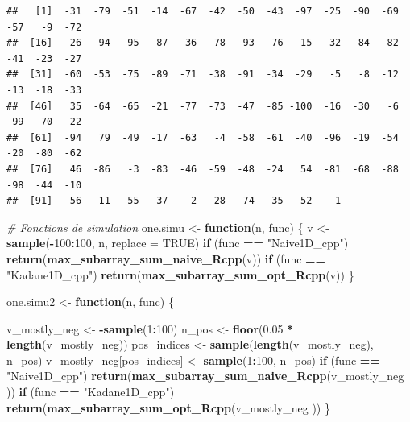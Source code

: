 \documentclass[
]{article}
\newenvironment{Shaded}{\begin{snugshade}}{\end{snugshade}}
\newcommand{\AttributeTok}[1]{\textcolor[rgb]{0.13,0.29,0.53}{#1}}
\newcommand{\CommentTok}[1]{\textcolor[rgb]{0.56,0.35,0.01}{\textit{#1}}}
\newcommand{\ConstantTok}[1]{\textcolor[rgb]{0.56,0.35,0.01}{#1}}
\newcommand{\ControlFlowTok}[1]{\textcolor[rgb]{0.13,0.29,0.53}{\textbf{#1}}}
\newcommand{\DecValTok}[1]{\textcolor[rgb]{0.00,0.00,0.81}{#1}}
\newcommand{\FloatTok}[1]{\textcolor[rgb]{0.00,0.00,0.81}{#1}}
\newcommand{\FunctionTok}[1]{\textcolor[rgb]{0.13,0.29,0.53}{\textbf{#1}}}
\newcommand{\NormalTok}[1]{#1}
\newcommand{\OtherTok}[1]{\textcolor[rgb]{0.56,0.35,0.01}{#1}}
\newcommand{\SpecialCharTok}[1]{\textcolor[rgb]{0.81,0.36,0.00}{\textbf{#1}}}
\newcommand{\StringTok}[1]{\textcolor[rgb]{0.31,0.60,0.02}{#1}}
\begin{document}
\begin{verbatim}
##   [1]  -31  -79  -51  -14  -67  -42  -50  -43  -97  -25  -90  -69  -57   -9  -72
##  [16]  -26   94  -95  -87  -36  -78  -93  -76  -15  -32  -84  -82  -41  -23  -27
##  [31]  -60  -53  -75  -89  -71  -38  -91  -34  -29   -5   -8  -12  -13  -18  -33
##  [46]   35  -64  -65  -21  -77  -73  -47  -85 -100  -16  -30   -6  -99  -70  -22
##  [61]  -94   79  -49  -17  -63   -4  -58  -61  -40  -96  -19  -54  -20  -80  -62
##  [76]   46  -86   -3  -83  -46  -59  -48  -24   54  -81  -68  -88  -98  -44  -10
##  [91]  -56  -11  -55  -37   -2  -28  -74  -35  -52   -1
\end{verbatim}

\begin{Shaded}
\begin{Highlighting}[]
\CommentTok{\# Fonctions de simulation}
\NormalTok{one.simu }\OtherTok{\textless{}{-}} \ControlFlowTok{function}\NormalTok{(n, func) \{}
\NormalTok{  v }\OtherTok{\textless{}{-}} \FunctionTok{sample}\NormalTok{(}\SpecialCharTok{{-}}\DecValTok{100}\SpecialCharTok{:}\DecValTok{100}\NormalTok{, n, }\AttributeTok{replace =} \ConstantTok{TRUE}\NormalTok{)}
  \ControlFlowTok{if}\NormalTok{ (func }\SpecialCharTok{==} \StringTok{"Naive1D\_cpp"}\NormalTok{) }\FunctionTok{return}\NormalTok{(}\FunctionTok{max\_subarray\_sum\_naive\_Rcpp}\NormalTok{(v))}
  \ControlFlowTok{if}\NormalTok{ (func }\SpecialCharTok{==} \StringTok{"Kadane1D\_cpp"}\NormalTok{) }\FunctionTok{return}\NormalTok{(}\FunctionTok{max\_subarray\_sum\_opt\_Rcpp}\NormalTok{(v))}
\NormalTok{\}}

\NormalTok{one.simu2 }\OtherTok{\textless{}{-}} \ControlFlowTok{function}\NormalTok{(n, func) \{}

\NormalTok{  v\_mostly\_neg }\OtherTok{\textless{}{-}} \SpecialCharTok{{-}}\FunctionTok{sample}\NormalTok{(}\DecValTok{1}\SpecialCharTok{:}\DecValTok{100}\NormalTok{)}
\NormalTok{  n\_pos }\OtherTok{\textless{}{-}} \FunctionTok{floor}\NormalTok{(}\FloatTok{0.05} \SpecialCharTok{*} \FunctionTok{length}\NormalTok{(v\_mostly\_neg))}
\NormalTok{  pos\_indices }\OtherTok{\textless{}{-}} \FunctionTok{sample}\NormalTok{(}\FunctionTok{length}\NormalTok{(v\_mostly\_neg), n\_pos)}
\NormalTok{  v\_mostly\_neg[pos\_indices] }\OtherTok{\textless{}{-}} \FunctionTok{sample}\NormalTok{(}\DecValTok{1}\SpecialCharTok{:}\DecValTok{100}\NormalTok{, n\_pos)}
  \ControlFlowTok{if}\NormalTok{ (func }\SpecialCharTok{==} \StringTok{"Naive1D\_cpp"}\NormalTok{) }\FunctionTok{return}\NormalTok{(}\FunctionTok{max\_subarray\_sum\_naive\_Rcpp}\NormalTok{(v\_mostly\_neg ))}
  \ControlFlowTok{if}\NormalTok{ (func }\SpecialCharTok{==} \StringTok{"Kadane1D\_cpp"}\NormalTok{) }\FunctionTok{return}\NormalTok{(}\FunctionTok{max\_subarray\_sum\_opt\_Rcpp}\NormalTok{(v\_mostly\_neg ))}
\NormalTok{\}}
\end{Highlighting}
\end{Shaded}
\end{document}
